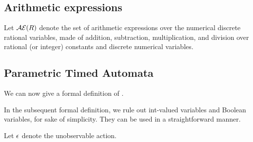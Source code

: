 \subsection{Arithmetic expressions}

Let $\mathcal{AE}(R)$ denote the set of arithmetic expressions over the numerical discrete rational variables, \ie{} made of addition, subtraction, multiplication, and division over rational (or integer) constants and discrete numerical variables.



\subsection{\imitator{} Parametric Timed Automata}


We can now give a formal definition of \IPTA{}.

\begin{remark}
	In the subsequent formal definition, we rule out int-valued variables and Boolean variables, for sake of simplicity.
	They can be used in a straightforward manner.
\end{remark}

Let $\epsilon$ denote the unobservable action.

